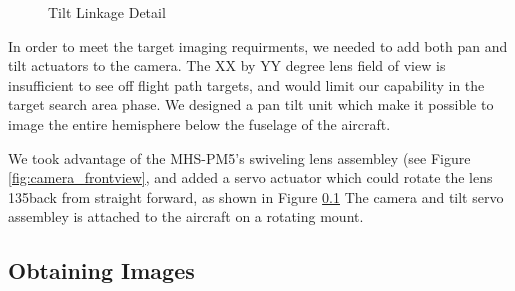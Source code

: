 \documentclass[10pt]{report}
\begin{document}
\begin{figure}
	\caption{Tilt Linkage Detail}
	\label{fig:pantilt_link}
\end{figure}

In order to meet the target imaging requirments, we needed to add both pan and tilt actuators to the camera. The XX by YY degree lens field of view is insufficient to see off flight path targets, and would limit our capability in the target search area phase. 
We designed a pan tilt unit which make it possible to image the entire hemisphere below the fuselage of the aircraft.

We took advantage of the MHS-PM5's swiveling lens assembley 
(see Figure \ref{fig:camera_frontview}, and added a servo actuator which could rotate the lens 135\textdegree back from straight forward, as shown in Figure \ref{}
The camera and tilt servo assembley is attached to the aircraft on a rotating mount. 


\subsection{Obtaining Images}
\end{document}
